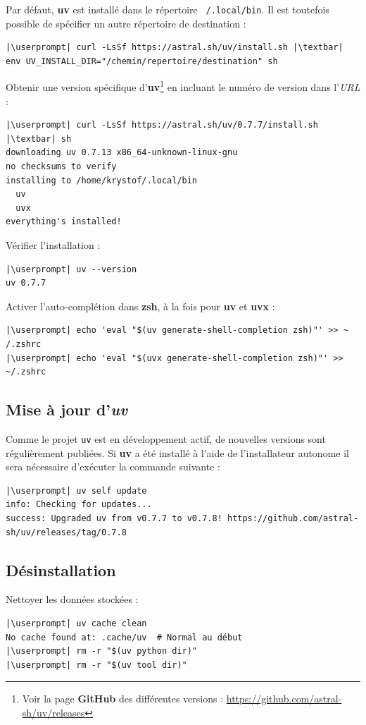 Par défaut, \textbf{uv} est installé dans le répertoire \texttt{~/.local/bin}. Il est toutefois possible de spécifier un autre répertoire de destination :
\begin{lstlisting}[style=bash]
|\userprompt| curl -LsSf https://astral.sh/uv/install.sh |\textbar| env UV_INSTALL_DIR="/chemin/repertoire/destination" sh
\end{lstlisting}

Obtenir une version spécifique d'\textbf{uv}\footnote{Voir la page \textbf{GitHub} des différentes versions : \url{https://github.com/astral-sh/uv/releases}} en incluant le numéro de version dans l'\textit{URL} :
\begin{lstlisting}[style=bash]
|\userprompt| curl -LsSf https://astral.sh/uv/0.7.7/install.sh |\textbar| sh
downloading uv 0.7.13 x86_64-unknown-linux-gnu
no checksums to verify
installing to /home/krystof/.local/bin
  uv
  uvx
everything's installed!
\end{lstlisting}

Vérifier l'installation :
\begin{lstlisting}[style=bash]
|\userprompt| uv --version 
uv 0.7.7
\end{lstlisting}

Activer l'auto-complétion dans \textbf{zsh}, à la fois pour \textbf{uv} et \textbf{uvx} :
\begin{lstlisting}[style=bash]
|\userprompt| echo 'eval "$(uv generate-shell-completion zsh)"' >> ~ /.zshrc
|\userprompt| echo 'eval "$(uvx generate-shell-completion zsh)"' >> ~/.zshrc
\end{lstlisting}

\subsection*{Mise à jour d'\textit{uv}}
Comme le projet \texttt{uv} est en développement actif, de nouvelles versions sont régulièrement publiées. Si \textbf{uv} a été installé à l'aide de l'installateur autonome il sera nécessaire d'exécuter la commande suivante :
\begin{lstlisting}[style=bash]
|\userprompt| uv self update
info: Checking for updates...
success: Upgraded uv from v0.7.7 to v0.7.8! https://github.com/astral-sh/uv/releases/tag/0.7.8
\end{lstlisting}

\subsection*{Désinstallation}
Nettoyer les données stockées :
\begin{lstlisting}[style=bash]
|\userprompt| uv cache clean
No cache found at: .cache/uv  # Normal au début
|\userprompt| rm -r "$(uv python dir)"
|\userprompt| rm -r "$(uv tool dir)"
\end{lstlisting}

